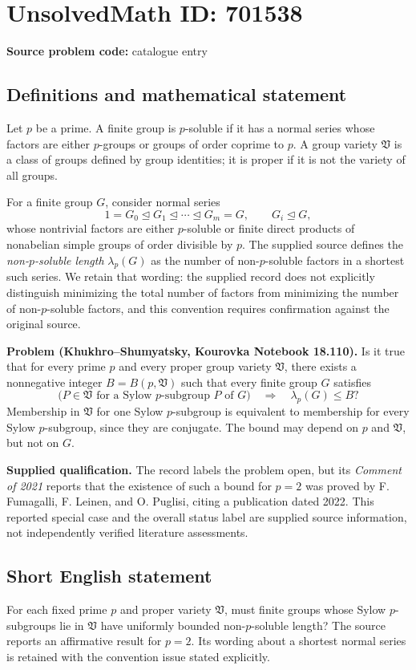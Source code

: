 \documentclass[11pt]{article}
\begin{document}
\section*{UnsolvedMath ID: 701538}
\textbf{Source problem code:} catalogue entry
\subsection{Definitions and mathematical statement}
Let \(p\) be a prime. A finite group is \(p\)-soluble if it has a normal series whose factors are either \(p\)-groups or groups of order coprime to \(p\). A group variety \(\mathfrak V\) is a class of groups defined by group identities; it is proper if it is not the variety of all groups.

For a finite group \(G\), consider normal series
\[
1=G_0\trianglelefteq G_1\trianglelefteq\cdots\trianglelefteq G_m=G,
\qquad G_i\trianglelefteq G,
\]
whose nontrivial factors are either \(p\)-soluble or finite direct products of nonabelian simple groups of order divisible by \(p\). The supplied source defines the \emph{non-\(p\)-soluble length} \(\lambda_p(G)\) as the number of non-\(p\)-soluble factors in a shortest such series. We retain that wording: the supplied record does not explicitly distinguish minimizing the total number of factors from minimizing the number of non-\(p\)-soluble factors, and this convention requires confirmation against the original source.

\textbf{Problem (Khukhro--Shumyatsky, Kourovka Notebook 18.110).} Is it true that for every prime \(p\) and every proper group variety \(\mathfrak V\), there exists a nonnegative integer \(B=B(p,\mathfrak V)\) such that every finite group \(G\) satisfies
\[
\bigl(P\in\mathfrak V\text{ for a Sylow }p\text{-subgroup }P\text{ of }G\bigr)
\quad\Longrightarrow\quad
\lambda_p(G)\le B?
\]
Membership in \(\mathfrak V\) for one Sylow \(p\)-subgroup is equivalent to membership for every Sylow \(p\)-subgroup, since they are conjugate. The bound may depend on \(p\) and \(\mathfrak V\), but not on \(G\).

\textbf{Supplied qualification.} The record labels the problem open, but its \emph{Comment of 2021} reports that the existence of such a bound for \(p=2\) was proved by F. Fumagalli, F. Leinen, and O. Puglisi, citing a publication dated 2022. This reported special case and the overall status label are supplied source information, not independently verified literature assessments.
\subsection{Short English statement}
For each fixed prime \(p\) and proper variety \(\mathfrak V\), must finite groups whose Sylow \(p\)-subgroups lie in \(\mathfrak V\) have uniformly bounded non-\(p\)-soluble length? The source reports an affirmative result for \(p=2\). Its wording about a shortest normal series is retained with the convention issue stated explicitly.
\end{document}
